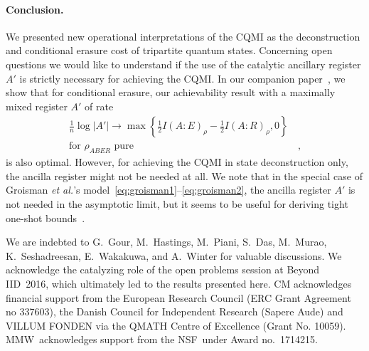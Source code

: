 \documentclass[a4paper,aps,prl,twocolumn,10pt,superscriptaddress]{revtex4-1}
\theoremstyle{plain}
\theoremstyle{definition}
\begin{document}

\paragraph{Conclusion.} We presented new operational interpretations of the CQMI as the deconstruction and conditional erasure cost of tripartite quantum states. Concerning open questions we would like to understand if the use of the catalytic ancillary register $A'$ is strictly necessary for achieving the CQMI. In our companion paper~\cite{BBMW_full16}, we show that for conditional erasure, our achievability result with a maximally mixed register $A'$ of rate
\begin{align*}
\frac{1}{n}\log|A'|\to\max\left\{\frac{1}{2}I(A:E)_\rho-\frac{1}{2}I(A:R)_\rho,0\right\}&\\
\text{for $\rho_{ABER}$ pure}&\,,
\end{align*}
is also optimal. However, for achieving the CQMI in state deconstruction only, the ancilla register might not be needed at all. We note that in the special case of Groisman {\it et al.}'s model~\eqref{eq:groisman1}--\eqref{eq:groisman2}, the ancilla register $A'$ is not needed in the asymptotic limit, but it seems to be useful for deriving tight one-shot bounds~\cite{MBDRC16}.


\begin{acknowledgments}
We are indebted to G.~Gour, M.~Hastings, M.~Piani, S.~Das, M.~Murao, K.~Seshadreesan, E.~Wakakuwa, and A.~Winter for valuable discussions. We acknowledge the catalyzing role of the open problems session at Beyond IID\ 2016, which ultimately led to the results presented here. CM acknowledges financial support from the European Research Council (ERC Grant Agreement no 337603), the Danish Council for Independent Research (Sapere Aude) and VILLUM FONDEN via the QMATH Centre of Excellence (Grant No. 10059). MMW\ acknowledges support from the NSF\ under Award no.~1714215.
\end{acknowledgments}



\end{document}
